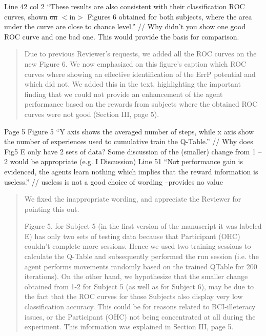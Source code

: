 \documentclass[journal,onecolumn,12pt]{IEEEtran}
\begin{document}
Line 42 col 2 “These results are also consistent with their classification ROC curves, shown \sout{on} $<$in$>$ Figures 6 obtained for both subjects, where the area under the curve are close to chance level.” // Why didn’t you show one good ROC curve and one bad one. This would provide the basis for comparison.

\begin{quotation}
{\color{blue}
Due to previous Reviewer's requests, we added all the ROC curves on the new Figure 6.  We now emphasized on this figure's caption which ROC curves where showing an effective identification of the ErrP potential and which did not.  We added this in the text, highlighting the important finding that we could not provide an enhancement of the agent performance based on the rewards from subjects where the obtained ROC curves were not good (Section III, page 5).
}
\end{quotation}

Page 5
Figure 5 “Y axis shows the averaged number of steps, while x axis show the number of
experiences used to cumulative train the Q-Table.”
// Why does Fig5 E only have 2 sets of data? Some discussion of the (smaller) change from 1 – 2 would be appropriate (e.g. I Discussion)
Line 51 “No\sout{t} performance gain is evidenced, the agents learn nothing which implies that the reward information is useless.” // useless is not a good choice of wording –provides no value

\begin{quotation}
{\color{blue}
We fixed the inappropriate wording, and appreciate the Reviewer for pointing this out. 

 
Figure 5, for Subject 5 (in the first version of the manuscript it was labeled E) has only two sets of testing data because that Participant (OHC) couldn't complete more sessions.  Hence we used two training sessions to calculate the Q-Table and subsequently performed the run session (i.e. the agent performs movements randomly based on the trained QTable for 200 iterations).
On the other hand, we hypothesize that the smaller change obtained from 1-2 for Subject 5 (as well as for Subject 6), may be due to the fact that the ROC curves for those Subjects also display very low classification accuracy.  This could be for reasons related to BCI-illeteracy issues, or the Participant (OHC) not being  concentrated at all during the experiment.  This information was explained in Section III, page 5.
}
\end{quotation}
\end{document}
